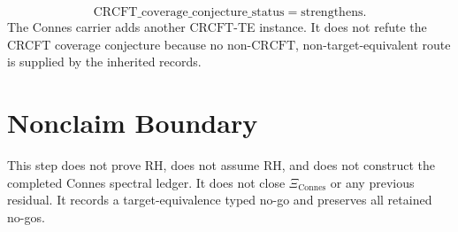 \documentclass[11pt]{article}
\newcommand{\XiConnes}{\Xi_{\mathrm{Connes}}}
\newcommand{\CRCFT}{\mathrm{CRCFT}}
\begin{document}
\[
\boxed{\mathrm{CRCFT\_coverage\_conjecture\_status}=\mathrm{strengthens}.}
\]
The Connes carrier adds another \(\CRCFT\)-TE instance.  It does not refute
the CRCFT coverage conjecture because no non-\(\CRCFT\), non-target-equivalent
route is supplied by the inherited records.

\section*{Nonclaim Boundary}

This step does not prove RH, does not assume RH, and does not construct the
completed Connes spectral ledger.  It does not close \(\XiConnes\) or any
previous residual.  It records a target-equivalence typed no-go and preserves
all retained no-gos.
\end{document}
